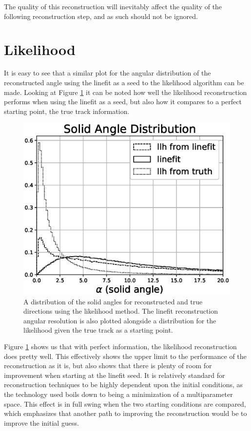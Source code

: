 The quality of this reconstruction will inevitably affect the quality of the following reconstruction step, and as such should not be ignored. 

\section{Likelihood}

It is easy to see that a similar plot for the angular distribution of the reconstructed angle using the linefit as a seed to the likelihood algorithm can be made. Looking at Figure \ref{fig:alpha_llh} it can be noted how well the likelihood reconstruction performs when using the linefit as a seed, but also how it compares to a perfect starting point, the true track information.

\begin{figure}[H]
  \centering
  \includegraphics[width=12cm]{./Figures/reco_plots/alpha_dist_llh_norm.eps}
  \caption{A distribution of the solid angles for reconstructed and true directions using the likelihood method. The linefit reconstruction angular resolution is also plotted alongside a distribution for the likelihood given the true track as a starting point.}
  \label{fig:alpha_llh}
\end{figure}

Figure \ref{fig:alpha_llh} shows us that with perfect information, the likelihood reconstruction does pretty well. This effectively shows the upper limit to the performance of the reconstruction as it is, but also shows that there is plenty of room for improvement when starting at the linefit seed. It is relatively standard for reconstruction techniques to be highly dependent upon the initial conditions, as the technology used boils down to being a minimization of a multiparameter space. This effect is in full swing when the two starting conditions are compared, which emphasizes that another path to improving the reconstruction would be to improve the initial guess.

